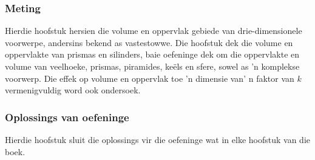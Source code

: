 \subsubsection{Meting}
Hierdie hoofstuk hersien die volume en oppervlak gebiede van drie-dimensionele voorwerpe, andersins bekend as vastestowwe. Die hoofstuk dek die volume en oppervlakte van prismas en silinders, baie oefeninge dek om die oppervlakte en volume van veelhoeke, prismas, piramides, keëls en sfere, sowel as 'n komplekse voorwerp. Die effek op volume en oppervlak toe 'n dimensie van' n faktor van $k$ vermenigvuldig
word ook ondersoek.

\subsubsection{Oplossings van oefeninge}
Hierdie hoofstuk sluit die oplossings vir die oefeninge wat in elke hoofstuk van die boek.
